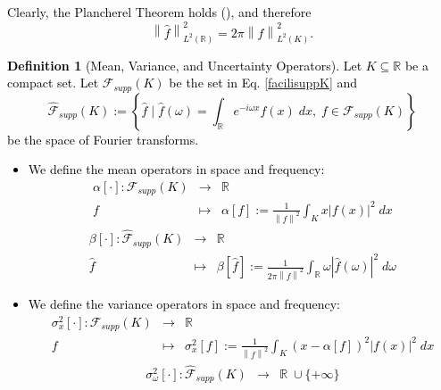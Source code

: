 \documentclass[preprint,hidelinks,authoryear]{elsarticle}
\theoremstyle{plain}
\theoremstyle{definition}
\newtheorem{definition}[theorem]{Definition}
\theoremstyle{remark}
\begin{document}
\textcolor{black}{Clearly, the Plancherel Theorem holds (\cite{rudin1987real}), and therefore
\begin{equation}
    \left \| \hat{f} \right \|_{L^2(\mathbb{R})}^2 = 2\pi \left \| f \right \|^2_{L^2(K)}.
    \label{plancherelnorme}
\end{equation}
\begin{definition}[Mean, Variance, and Uncertainty Operators]
    Let $ K \subseteq \mathbb{R} $ be a compact set. Let $ \mathcal{F}_{supp}(K) $ be the set in Eq. \eqref{facilisuppK} and
    $$\hat{\mathcal{F}}_{supp}(K) := \left\{ \hat{f} \mid \hat{f}(\omega) = \int_\mathbb{R} e^{-i\omega x} f(x) \; dx, \; f \in \mathcal{F}_{supp}(K) \right\}$$
    be the space of Fourier transforms.
 \begin{itemize}   
\item[a)] We define the mean operators in space and frequency:
\begin{equation}
\begin{array}{rcl}
    \alpha[\cdot]: \mathcal{F}_{supp}(K) & \to & \mathbb{R} \\
    f & \mapsto & \alpha[f]:= \displaystyle\frac{1}{ \left \| f \right \|^2} \int_K x |f(x)|^2 \; dx
    \label{mediaspazio}
\end{array}
\end{equation}
\begin{equation}
\begin{array}{rcl}
    \beta[\cdot]: \hat{\mathcal{F}}_{supp}(K) & \to & \mathbb{R} \\
    \hat{f} & \mapsto & \beta[\hat{f}]:= \displaystyle\frac{1}{2\pi \left \| f \right \|^2} \int_{\mathbb{R}} \omega |\hat{f}(\omega)|^2 \; d\omega
    \label{mediafrequenza}
\end{array}
\end{equation}
\item[b)] We define the variance operators in space and frequency:
\begin{equation}
\begin{array}{rcl}
    \sigma_x^2[\cdot]: \mathcal{F}_{supp}(K) & \to & \mathbb{R} \\
    f & \mapsto & \sigma_x^2[f]:=\displaystyle \frac{1}{ \left \| f \right \|^2} \int_K (x - \alpha[f])^2 |f(x)|^2 \; dx
    \label{varianzaspazio}
\end{array}
\end{equation}
\begin{equation}
\begin{array}{rcl}
    \sigma_{\omega}^2[\cdot]: \hat{\mathcal{F}}_{supp}(K) & \to & \mathbb{R} \; \cup \{+\infty\} \\

\end{array}
\end{equation}
\end{itemize}
\end{definition}}
\end{document}
